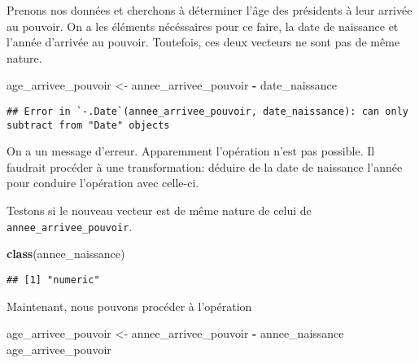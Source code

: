 \documentclass[]{book}
\newenvironment{Shaded}{\begin{snugshade}}{\end{snugshade}}
\newcommand{\KeywordTok}[1]{\textcolor[rgb]{0.13,0.29,0.53}{\textbf{#1}}}
\newcommand{\StringTok}[1]{\textcolor[rgb]{0.31,0.60,0.02}{#1}}
\newcommand{\OperatorTok}[1]{\textcolor[rgb]{0.81,0.36,0.00}{\textbf{#1}}}
\newcommand{\NormalTok}[1]{#1}
\begin{document}
Prenons nos données et cherchons à déterminer l'âge des présidents à
leur arrivée au pouvoir. On a les éléments nécéssaires pour ce faire, la
date de naissance et l'année d'arrivée au pouvoir. Toutefois, ces deux
vecteurs ne sont pas de même nature.

\begin{Shaded}
\begin{Highlighting}[]
\NormalTok{age_arrivee_pouvoir <-}\StringTok{ }\NormalTok{annee_arrivee_pouvoir }\OperatorTok{-}\StringTok{ }\NormalTok{date_naissance}
\end{Highlighting}
\end{Shaded}

\begin{verbatim}
## Error in `-.Date`(annee_arrivee_pouvoir, date_naissance): can only subtract from "Date" objects
\end{verbatim}

On a un message d'erreur. Apparemment l'opération n'est pas possible. Il
faudrait procéder à une transformation: déduire de la date de naissance
l'année pour conduire l'opération avec celle-ci.

\begin{Shaded}
\end{Shaded}

Testons si le nouveau vecteur est de même nature de celui de
\texttt{annee\_arrivee\_pouvoir}.

\begin{Shaded}
\begin{Highlighting}[]
\KeywordTok{class}\NormalTok{(annee_naissance)}
\end{Highlighting}
\end{Shaded}

\begin{verbatim}
## [1] "numeric"
\end{verbatim}

Maintenant, nous pouvons procéder à l'opération

\begin{Shaded}
\begin{Highlighting}[]
\NormalTok{age_arrivee_pouvoir <-}\StringTok{ }\NormalTok{annee_arrivee_pouvoir }\OperatorTok{-}\StringTok{ }\NormalTok{annee_naissance}
\NormalTok{age_arrivee_pouvoir}
\end{Highlighting}
\end{Shaded}
\end{document}
